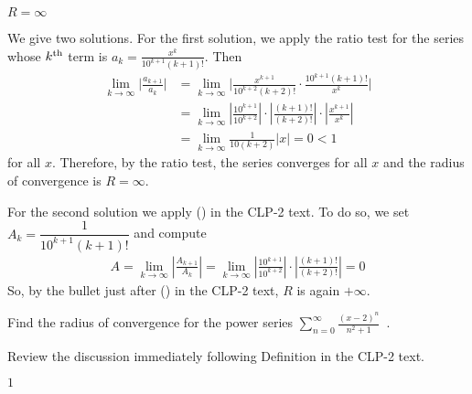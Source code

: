 \begin{answer}
$R = \infty$
\end{answer}

\begin{solution}
We give two solutions. For the first solution, we apply the ratio test for the series whose $k^{\rm th}$
term is $a_k= \frac{x^k}{ 10^{k+1}(k+1)! }$. Then
\begin{align*}
\lim_{k\to\infty} \bigg| \frac{ a_{k+1} }{ a_k } \bigg|
&= \lim_{k\to\infty} \bigg| \frac{x^{k+1}}{10^{k+2}(k+2)!} \cdot
                             \frac{10^{k+1}(k+1)!}{x^k} \bigg| \\
&=\lim_{k\to\infty} \left|\frac{10^{k+1}}{10^{k+2}}\right|\cdot\left|\frac{(k+1)!}{(k+2)!}\right|\cdot\left|\frac{x^{k+1}}{x^k}\right|\\
&= \lim_{k\to\infty}\frac{1}{10(k+2)}|x| = 0 < 1
\end{align*}
for all $x$.
Therefore, by the ratio test, the series converges for all $x$
and the radius of convergence is $R = \infty$.

For the second solution we apply () in the CLP-2 text. To do so, we set 
$A_k = \dfrac{1}{10^{k+1}(k+1)!}$ and compute 
\begin{align*}
A = \lim_{k\to\infty} \left| \frac{A_{k+1}}{A_k}\right| 
  =\lim_{k\to\infty} \left|\frac{10^{k+1}}{10^{k+2}}\right|\cdot\left|\frac{(k+1)!}{(k+2)!}\right|
  = 0
\end{align*}
So, by the bullet just after () in the CLP-2 text, $R$ is again $+\infty$.


\end{solution}


\begin{question}[2014A]
Find the radius of convergence for the power series
$\displaystyle\sum_{n=0}^\infty \frac{(x - 2)^n}{n^2+1}$\ .
\end{question}

\begin{hint}
Review the discussion immediately following Definition
 in the
CLP-2 text.
\end{hint}

\begin{answer}
$1$
\end{answer}


